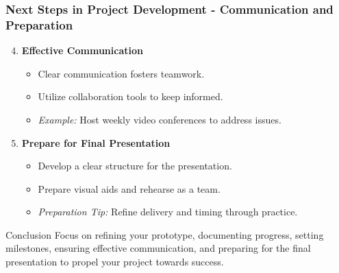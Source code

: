 \documentclass[aspectratio=169]{beamer}
\begin{document}
\begin{frame}[fragile]
    \frametitle{Next Steps in Project Development - Communication and Preparation}
    \begin{enumerate}
        \setcounter{enumi}{3} %
        \item \textbf{Effective Communication}
            \begin{itemize}
                \item Clear communication fosters teamwork.
                \item Utilize collaboration tools to keep informed.
                \item \textit{Example:} Host weekly video conferences to address issues.
            \end{itemize}

        \item \textbf{Prepare for Final Presentation}
            \begin{itemize}
                \item Develop a clear structure for the presentation.
                \item Prepare visual aids and rehearse as a team.
                \item \textit{Preparation Tip:} Refine delivery and timing through practice.
            \end{itemize}
    \end{enumerate}
    
    \begin{block}{Conclusion}
        Focus on refining your prototype, documenting progress, setting milestones, ensuring effective communication, and preparing for the final presentation to propel your project towards success.
    \end{block}
\end{frame}
\end{document}
